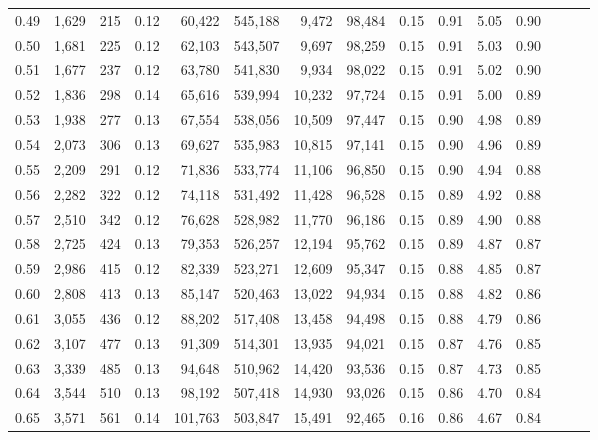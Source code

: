 \begin{tabular}{rrrrrrrrrrrrrrr}
0.49 &   1,629 &     215 &  0.12 &   60,422 &  545,188 &    9,472 &   98,484 &  0.15 &  0.91 &  5.05 &      0.90 \\
0.50 &   1,681 &     225 &  0.12 &   62,103 &  543,507 &    9,697 &   98,259 &  0.15 &  0.91 &  5.03 &      0.90 \\
0.51 &   1,677 &     237 &  0.12 &   63,780 &  541,830 &    9,934 &   98,022 &  0.15 &  0.91 &  5.02 &      0.90 \\
0.52 &   1,836 &     298 &  0.14 &   65,616 &  539,994 &   10,232 &   97,724 &  0.15 &  0.91 &  5.00 &      0.89 \\
0.53 &   1,938 &     277 &  0.13 &   67,554 &  538,056 &   10,509 &   97,447 &  0.15 &  0.90 &  4.98 &      0.89 \\
0.54 &   2,073 &     306 &  0.13 &   69,627 &  535,983 &   10,815 &   97,141 &  0.15 &  0.90 &  4.96 &      0.89 \\
0.55 &   2,209 &     291 &  0.12 &   71,836 &  533,774 &   11,106 &   96,850 &  0.15 &  0.90 &  4.94 &      0.88 \\
0.56 &   2,282 &     322 &  0.12 &   74,118 &  531,492 &   11,428 &   96,528 &  0.15 &  0.89 &  4.92 &      0.88 \\
0.57 &   2,510 &     342 &  0.12 &   76,628 &  528,982 &   11,770 &   96,186 &  0.15 &  0.89 &  4.90 &      0.88 \\
0.58 &   2,725 &     424 &  0.13 &   79,353 &  526,257 &   12,194 &   95,762 &  0.15 &  0.89 &  4.87 &      0.87 \\
0.59 &   2,986 &     415 &  0.12 &   82,339 &  523,271 &   12,609 &   95,347 &  0.15 &  0.88 &  4.85 &      0.87 \\
0.60 &   2,808 &     413 &  0.13 &   85,147 &  520,463 &   13,022 &   94,934 &  0.15 &  0.88 &  4.82 &      0.86 \\
0.61 &   3,055 &     436 &  0.12 &   88,202 &  517,408 &   13,458 &   94,498 &  0.15 &  0.88 &  4.79 &      0.86 \\
0.62 &   3,107 &     477 &  0.13 &   91,309 &  514,301 &   13,935 &   94,021 &  0.15 &  0.87 &  4.76 &      0.85 \\
0.63 &   3,339 &     485 &  0.13 &   94,648 &  510,962 &   14,420 &   93,536 &  0.15 &  0.87 &  4.73 &      0.85 \\
0.64 &   3,544 &     510 &  0.13 &   98,192 &  507,418 &   14,930 &   93,026 &  0.15 &  0.86 &  4.70 &      0.84 \\
0.65 &   3,571 &     561 &  0.14 &  101,763 &  503,847 &   15,491 &   92,465 &  0.16 &  0.86 &  4.67 &      0.84 \\

\end{tabular}

